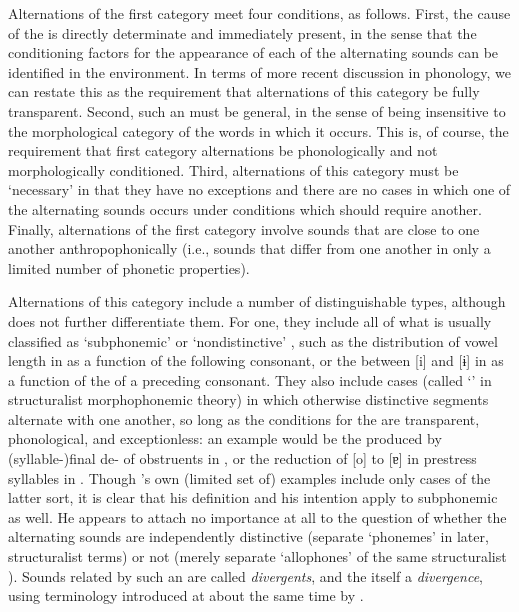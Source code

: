 Alternations of the first category meet four conditions, as
follows. First, the cause of the  is directly determinate
and immediately present, in the sense that the conditioning factors
for the appearance of each of the alternating sounds can be identified
in the environment. In terms of more recent discussion in phonology,
we can restate this as the requirement that alternations of this
category be fully transparent. Second, such an  must be
general, in the sense of being insensitive to the morphological
category of the words in which it occurs. This is, of course, the
requirement that first category alternations be phonologically and not
morphologically conditioned. Third, alternations of this category must
be `necessary' in that they have no exceptions and there are no cases
in which one of the alternating sounds occurs under conditions which
should require another. Finally, alternations of the first category
involve sounds that are close to one another anthropophonically (i.e.,
sounds that differ from one another in only a limited number of
phonetic properties).

Alternations of this category include a number of distinguishable
types, although {\Kruszewski} does not further differentiate them. For
one, they include all of what is usually classified as `subphonemic'
or `nondistinctive' , such as the distribution of vowel
length in  as a function of the following consonant, or the
 between {[i]} and {[ɨ]} in  as a function of the
 of a preceding consonant. They also include cases
(called `' in structuralist morphophonemic
theory) in which otherwise distinctive segments alternate with one
another, so long as the conditions for the  are
transparent, phonological, and exceptionless: an example would be the
 produced by (syllable-)final de- of obstruents in
, or the reduction of [o] to [ɐ] in prestress syllables in
. Though {\Kruszewski}'s own (limited set of) examples include
only cases of the latter sort, it is clear
\citep{klausenburger78:kruszewski} that his definition and his
intention apply to subphonemic  as well. He appears to attach
no importance at all to the question of whether the alternating sounds
are independently distinctive (separate `phonemes' in later,
structuralist terms) or not (merely separate `allophones' of the same
structuralist ). Sounds related by such an  are
called \emph{divergents}, and the  itself a
\emph{divergence}, using terminology introduced at about the same time
by {\Baudouin}.

